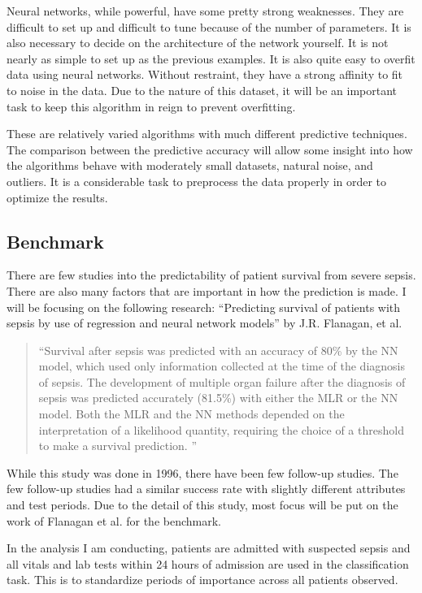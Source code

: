 \documentclass[11pt]{article}
\begin{document}
\begin{enumerate}
		Neural networks, while powerful, have some pretty strong weaknesses. They are difficult to set up and difficult to tune because of the number of parameters. It is also necessary to decide on the architecture of the network yourself. It is not nearly as simple to set up as the previous examples. It is also quite easy to overfit data using neural networks. Without restraint, they have a strong affinity to fit to noise in the data. Due to the nature of this dataset, it will be an important task to keep this algorithm in reign to prevent overfitting.
	\end{enumerate}
	
	These are relatively varied algorithms with much different predictive techniques. The comparison between the predictive accuracy will allow some insight into how the algorithms behave with moderately small datasets, natural noise, and outliers. It is a considerable task to preprocess the data properly in order to optimize the results.
	
	\subsection{Benchmark}
	There are few studies into the predictability of patient survival from severe sepsis. There are also many factors that are important in how the prediction is made. I will be focusing on the following research: ``Predicting survival of patients with sepsis by use of regression and neural network models'' by J.R. Flanagan, et al. 
	\begin{quotation}
		``Survival after sepsis was predicted with an accuracy of 80\% by the NN model, which used only information collected at the time of the diagnosis of sepsis. The development of multiple organ failure after the diagnosis of sepsis was predicted accurately (81.5\%) with either the MLR or the NN model. Both the MLR and the NN methods depended on the interpretation of a likelihood quantity, requiring the choice of a threshold to make a survival prediction. ''\cite{sepsisresearch}
	\end{quotation}
	
	While this study was done in 1996, there have been few follow-up studies. The few follow-up studies had a similar success rate with slightly different attributes and test periods. Due to the detail of this study, most focus will be put on the work of Flanagan et al. for the benchmark.
	
	In the analysis I am conducting, patients are admitted with suspected sepsis and all vitals and lab tests within 24 hours of admission are used in the classification task. This is to standardize periods of importance across all patients observed.
	
\end{document}
